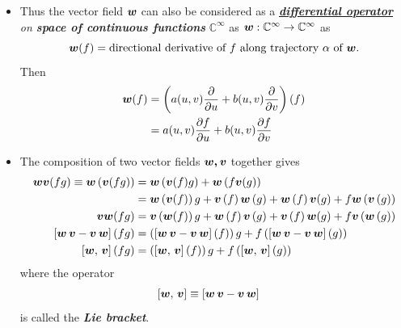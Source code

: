 \documentclass[11pt]{article}
\begin{document}
\begin{itemize}
\item Thus the vector field $\boldsymbol{w}$ can also be considered as a \emph{\underline{\textbf{differential operator}} on \textbf{space of continuous functions}} $\mathbb{C}^{\infty}$ as $\boldsymbol{w}: \mathbb{C}^{\infty} \rightarrow \mathbb{C}^{\infty}$ as $$\boldsymbol{w}(f) = \text{directional derivative of }f\text{ along trajectory }\alpha \text{ of }\boldsymbol{w}.$$ 
 Then 
 \begin{align*}
 \boldsymbol{w}(f) &= \left(a(u,v)\frac{\partial }{ \partial u} + b(u,v)\frac{\partial }{ \partial v}\right)(f)\\
 &= a(u,v)\frac{\partial f}{ \partial u} + b(u,v)\frac{\partial f}{ \partial v}
 \end{align*}
 
 \item The composition of two vector fields $\boldsymbol{w,v}$ together gives 
 \begin{align*}
\boldsymbol{w}\boldsymbol{v}(fg)\equiv \boldsymbol{w}\left(\boldsymbol{v}(fg)\right) &= \boldsymbol{w}\left(\boldsymbol{v}(f)g\right)+ \boldsymbol{w}\left(f\boldsymbol{v}(g)\right)\\
 &= \boldsymbol{w}\left(\boldsymbol{v}(f)\right)g+  \boldsymbol{v}\left(f\right)\boldsymbol{w}\left(g\right)+ \boldsymbol{w}\left(f\right)\boldsymbol{v}(g)+ f\boldsymbol{w}\left(\boldsymbol{v}\left(g\right)\right)\\
 \boldsymbol{v}\boldsymbol{w}(fg) &=
 \boldsymbol{v}\left(\boldsymbol{w}(f)\right)g+  \boldsymbol{w}\left(f\right)\boldsymbol{v}\left(g\right)+ \boldsymbol{v}\left(f\right)\boldsymbol{w}(g)+ f\boldsymbol{v}\left(\boldsymbol{w}\left(g\right)\right)\\
 \left[\boldsymbol{w\,v} - \boldsymbol{v\,w}\right](fg) &= \left(\left[\boldsymbol{w\,v} - \boldsymbol{v\,w}\right](f)\right)g + f\left(\left[\boldsymbol{w\,v} - \boldsymbol{v\,w}\right](g)\right)\\
 \left[\boldsymbol{w},\, \boldsymbol{v}\right](fg) &= \left(\left[\boldsymbol{w},\, \boldsymbol{v}\right](f)\right)g + f\left(\left[\boldsymbol{w},\, \boldsymbol{v}\right](g)\right)
 \end{align*}
 where the operator
 \begin{align*}
 \left[\boldsymbol{w},\, \boldsymbol{v}\right] &\equiv \left[\boldsymbol{w\,v} - \boldsymbol{v\,w}\right]
 \end{align*}
 is called the \emph{\textbf{Lie bracket}}. 
\end{itemize}



\newpage


\end{document}
